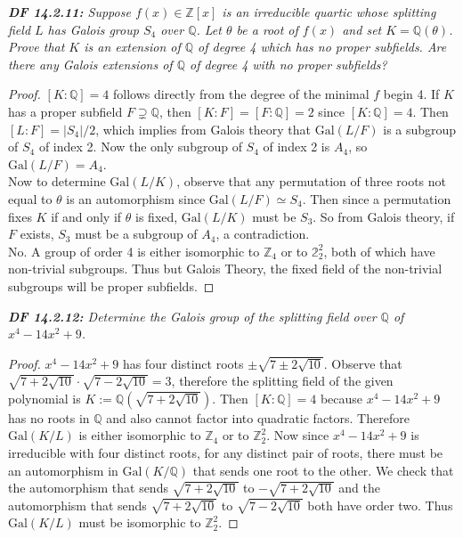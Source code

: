 \documentclass{article}
\begin{document}
\it \textbf{DF 14.2.11:} Suppose $f(x)\in\mathbb{Z}[x]$ is an irreducible
  quartic whose splitting field $L$ has Galois group $S_4$ over $\mathbb{Q}$.
  Let $\theta$ be a root of $f(x)$ and set $K=\mathbb{Q}(\theta)$. Prove
  that $K$ is an extension of $\mathbb{Q}$ of degree 4 which has no proper
  subfields. Are there any Galois extensions of $\mathbb{Q}$ of degree 4
  with no proper subfields?

  \begin{proof}
    $[K:\mathbb{Q}]=4$ follows directly from the degree of the minimal $f$
    begin 4. If $K$ has a proper subfield $F\supsetneq\mathbb{Q}$, then
    $[K:F]=[F:\mathbb{Q}]=2$ since $[K:\mathbb{Q}]=4$. Then
    $[L:F]=|S_4|/2$, which implies from Galois theory that
    $\text{Gal}(L/F)$ is a subgroup of $S_4$ of index 2. Now the only
    subgroup of $S_4$ of index 2 is $A_4$, so $\text{Gal}(L/F)=A_4$. \\

    Now to determine $\text{Gal}(L/K)$, observe that any permutation of
    three roots not equal to $\theta$ is an automorphism since
    $\text{Gal}(L/F)\simeq S_4$. Then since a permutation fixes $K$ if and
    only if $\theta$ is fixed, $\text{Gal}(L/K)$ must be $S_3$.  So from
    Galois theory, if $F$ exists, $S_3$ must be a subgroup of $A_4$, a
    contradiction. \\

    No. A group of order 4 is either isomorphic to $\mathbb{Z}_4$ or to
    $\mathbb{2}_2^2$, both of which have non-trivial subgroups. Thus but
    Galois Theory, the fixed field of the non-trivial subgroups will be
    proper subfields.
  \end{proof}

\it \textbf{DF 14.2.12:} Determine the Galois group of the splitting field
  over $\mathbb{Q}$ of $x^4-14x^2+9$.

  \begin{proof}
    $x^4-14x^2+9$ has four distinct roots $\pm\sqrt{7\pm2\sqrt{10}}$.
    Observe that $\sqrt{7+2\sqrt{10}} \cdot\sqrt{7-2\sqrt{10}} =3$,
    therefore the splitting field of the given polynomial is
    $K:=\mathbb{Q}(\sqrt{7+2\sqrt{10}})$. Then
    $[K:\mathbb{Q}]=4$ because $x^4-14x^2+9$
    has no roots in $\mathbb{Q}$ and also cannot factor into quadratic
    factors. Therefore $\text{Gal}(K/L)$ is either isomorphic to
    $\mathbb{Z}_4$ or to $\mathbb{Z}_2^2$. Now since $x^4-14x^2+9$ is
    irreducible with four distinct roots, for any distinct pair of roots,
    there must be an automorphism in $\text{Gal}(K/\mathbb{Q})$ that sends
    one root to the other. We check that the automorphism that sends
    $\sqrt{7+2\sqrt{10}}$ to $-\sqrt{7+2\sqrt{10}}$ and the automorphism
    that sends $\sqrt{7+2\sqrt{10}}$ to $\sqrt{7-2\sqrt{10}}$ both have
    order two. Thus $\text{Gal}(K/L)$ must be isomorphic to
    $\mathbb{Z}_2^2$.
  \end{proof}
\end{document}
